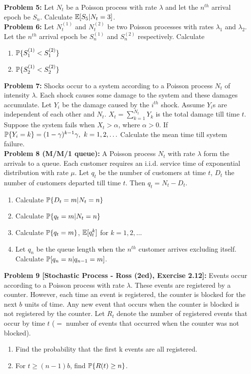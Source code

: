 \documentclass[a4paper,11pt,english]{article}
\begin{document}
\indent \textbf{Problem 5:} Let $N_t$ be a Poisson process with rate $\lambda$ and let the $n^{th}$ arrival epoch be $S_n$. Calculate $\E[S_5|N_t = 3]$. \\
\indent \textbf{Problem 6:} Let $N^{(1)}_t$ and $N^{(2)}_t$ be two  Poisson processes with rates $\lambda_1$ and $\lambda_2$. Let the $n^{th}$ arrival epoch be $S^{(1)}_n$ and $S^{(2)}_n$ respectively. Calculate
\begin{enumerate}
\item $\P\{ S^{(1)}_1 < S^{(2)}_1\}$
\item $\P\{ S^{(1)}_2 < S^{(2)}_2\}$
\end{enumerate} 

\indent \textbf{Problem 7:} Shocks occur to a system according to a Poisson process $N_t$ of intensity $\lambda$. Each shock causes some damage to the system and these damages accumulate. Let $Y_i$ be the damage caused by the $i^{th}$ shock. Assume $Y_i$s are independent of each other and $N_t$. $X_t = \sum_{k=1}^{N_t} Y_k$ is the total damage till time $t$. Suppose the system fails when $X_t > \alpha$, where $\alpha > 0$. If $\P\{Y_i = k\} = (1-\gamma)^{k-1}\gamma, \ k = 1,2,\ldots$ Calculate the mean time till system failure.  \\
\indent \textbf{Problem 8 (M/M/1 queue):} A Poisson process $N_t$ with rate $\lambda$ form the arrivals to a queue. Each customer requires an i.i.d. service time of exponential distribution with rate $\mu$. Let $q_t$ be the number of customers at time $t$, $D_t$ the number of customers departed till time $t$. Then $q_t = N_t - D_t$. 
\begin{enumerate}
\item Calculate $\P\{D_t=m|N_t=n\}$
\item Calculate $\P\{q_t=m|N_t=n\}$
\item Calculate $\P\{q_t=m\}$, $\E[q_t^k]$ for $k=1,2,\ldots$
\item Let $q_n$ be the queue length when the $n^{th}$ customer arrives excluding itself. Calculate $\P[q_n = n|q_{n-1} = m]$.
\end{enumerate}

\indent \textbf{Problem 9 [Stochastic Process - Ross (2ed), Exercise 2.12]:} Events occur according to a Poisson process with rate $\lambda$. These events are registered by a counter. However, each time an event is registered, the counter is blocked for the next $b$ units of time. Any new event that occurs when the counter is blocked is not registered by the counter. Let $R_t$ denote the number of registered events that occur by time $t$ ($=$ number of events that occurred when the counter was not blocked). 
\begin{enumerate}
\item Find the probability that the first k events are all registered.
\item For $t \geq (n-1)b$, find $\P\{R(t) \geq n\}$.
\end{enumerate}
\end{document}
